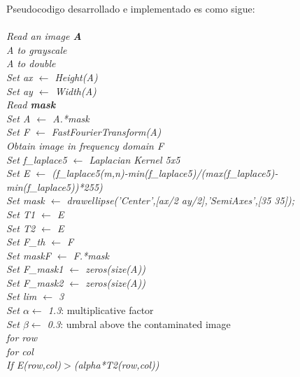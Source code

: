 \documentclass[10pt,letterpaper]{article}
\begin{document}
Pseudocodigo desarrollado e implementado es como sigue:
\\\\
\hrulefill \textit{Read an image \textbf{A}} \\
\hspace*{0.5cm}\textit{A to grayscale}\\
\hspace*{0.5cm}\textit{A to double}\\
\hspace*{0.5cm}\textit{Set ax $\longleftarrow$ Height(A)}\\
\hspace*{0.5cm}\textit{Set ay $\longleftarrow$ Width(A)}\\
\textit{Read \textbf{mask}}\\
\textit{Set A $\longleftarrow$ A.*mask}\\
\textit{Set F $\longleftarrow$ FastFourierTransform(A)}\\
\textit{Obtain image in frequency domain F}\\
\textit{Set f\_laplace5 $\longleftarrow$ Laplacian Kernel 5x5}\\
\textit{Set E $\longleftarrow$ (f\_laplace5(m,n)-min(f\_laplace5)/(max(f\_laplace5)-min(f\_laplace5))*255)}\\
\textit{Set mask $\longleftarrow$ drawellipse('Center',[ax/2 ay/2],'SemiAxes',[35 35]);}	\\
\textit{Set T1 $\longleftarrow$ E}\\
\textit{Set T2 $\longleftarrow$ E}	\\
\textit{Set F\_th $\longleftarrow$ F}\\
\textit{Set maskF $\longleftarrow$ F.*mask}	\\
\textit{Set F\_mask1 $\longleftarrow$ zeros(size(A))}	\\
\textit{Set F\_mask2 $\longleftarrow$ zeros(size(A))}	\\
\textit{Set lim $\longleftarrow$ 3}\\
\textit{Set $\alpha \longleftarrow$ 1.3}: multiplicative factor\\
\textit{Set $\beta \longleftarrow$ 0.3}: umbral above the contaminated image\\
\textit{for row}\\
\hspace*{0.5cm}\textit{for col}\\
\hspace*{1cm}\textit{If E(row,col)$>$(alpha*T2(row,col))}\\
\end{document}

